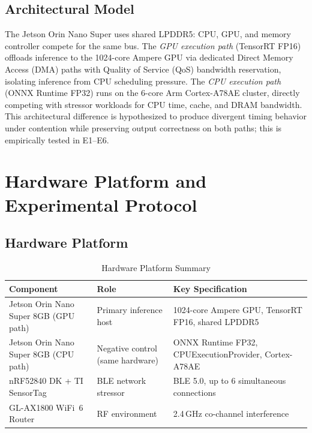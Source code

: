 \documentclass[journal,10pt,twocolumn]{IEEEtran}
\begin{document}
\subsection{Architectural Model}

The Jetson Orin Nano Super uses shared LPDDR5: CPU, GPU, and memory
controller compete for the same bus.
The \emph{GPU execution path} (TensorRT FP16) offloads inference to the
1024-core Ampere GPU via dedicated Direct Memory Access (DMA) paths with Quality of Service (QoS) bandwidth
reservation, isolating inference from CPU scheduling pressure.
The \emph{CPU execution path} (ONNX Runtime FP32) runs on the
6-core Arm Cortex-A78AE cluster, directly competing with stressor
workloads for CPU time, cache, and DRAM bandwidth.
This architectural difference is hypothesized to produce divergent
timing behavior under contention while preserving output correctness on both paths; this is empirically tested in E1--E6.

\section{Hardware Platform and Experimental Protocol}

\subsection{Hardware Platform}

\begin{table}[!t]
\caption{Hardware Platform Summary}
\label{tab:hardware}
\centering
\small
\begin{tabular}{p{2.4cm}p{1.5cm}p{3.6cm}}
\toprule
\textbf{Component} & \textbf{Role} & \textbf{Key Specification} \\
\midrule
Jetson Orin Nano Super 8GB (GPU path)
  & Primary inference host
  & 1024-core Ampere GPU, TensorRT FP16, shared LPDDR5 \\
Jetson Orin Nano Super 8GB (CPU path)
  & Negative control (same hardware)
  & ONNX Runtime FP32, CPUExecutionProvider, Cortex-A78AE \\
nRF52840 DK + TI SensorTag
  & BLE network stressor
  & BLE 5.0, up to 6 simultaneous connections \\
GL-AX1800 WiFi~6 Router
  & RF environment
  & 2.4\,GHz co-channel interference \\
\bottomrule
\end{tabular}
\end{table}
\end{document}
